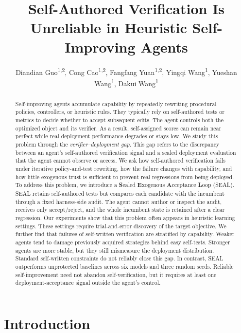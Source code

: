 \documentclass[letterpaper]{article} \usepackage{aaai2027}  \usepackage[hyphens]{url}  \usepackage{graphicx} \urlstyle{rm} \def\UrlFont{\rm}  \usepackage{natbib}  \usepackage{caption} \usepackage{amsfonts} \usepackage{multirow} \frenchspacing  \usepackage{algorithm}
\title{Self-Authored Verification Is Unreliable in Heuristic Self-Improving Agents}
\author{Diandian Guo\textsuperscript{\rm 1,2}, Cong Cao\textsuperscript{\rm 1,2}\corresponding, Fangfang Yuan\textsuperscript{\rm 1,2}, Yingqi Wang\textsuperscript{\rm 1}, Yueshan Wang\textsuperscript{\rm 1}, Dakui Wang\textsuperscript{\rm 1}}
\begin{document}
\maketitle

\begin{abstract}
Self-improving agents accumulate capability by repeatedly rewriting procedural policies, controllers, or heuristic rules. They typically rely on self-authored tests or metrics to decide whether to accept subsequent edits. 
The agent controls both the optimized object and its verifier. As a result, self-assigned scores can remain near perfect while real deployment performance degrades or stays low.
We study this problem through the \emph{verifier--deployment gap}.  This gap refers to the discrepancy between an agent’s self-authored verification signal and a sealed deployment evaluation that the agent cannot observe or access.
We ask how self-authored verification fails under iterative policy-and-test rewriting, how the failure changes with capability, and how little exogenous trust is sufficient to prevent real regressions from being deployed.
To address this problem, we introduce a \textbf{S}ealed \textbf{E}xogenous \textbf{A}cceptance \textbf{L}oop (SEAL). SEAL retains self-authored tests but compares each candidate with the incumbent through a fixed harness-side audit.
The agent cannot author or inspect the audit, receives only accept/reject, and the whole incumbent state is retained after a clear regression.
Our experiments show that this problem often appears in heuristic learning settings. These settings require trial-and-error discovery of the target objective. 
We further find that failures of self-written verification are stratified by capability. Weaker agents tend to damage previously acquired strategies behind easy self-tests. Stronger agents are more stable, but they still mismeasure the deployment distribution. Standard self-written constraints do not reliably close this gap. In contrast, SEAL outperforms unprotected baselines across six models and three random seeds.
Reliable self-improvement need not abandon self-verification, but it requires at least one deployment-acceptance signal outside the agent's control.

\end{abstract}

\section{Introduction}
\end{document}

